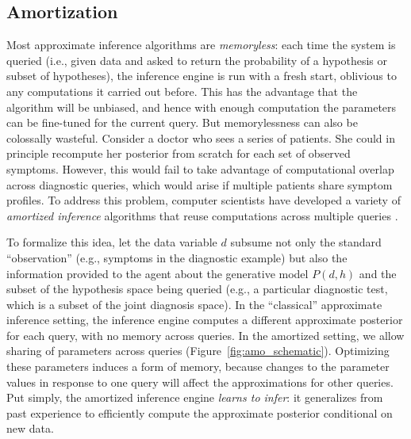 \subsection{Amortization}

Most approximate inference algorithms are \emph{memoryless}: each time the system is queried (i.e., given data and asked to return the probability of a hypothesis or subset of hypotheses), the inference engine is run with a fresh start, oblivious to any computations it carried out before. This has the advantage that the algorithm will be unbiased, and hence with enough computation the parameters can be fine-tuned for the current query. But memorylessness can also be colossally wasteful. Consider a doctor who sees a series of patients. She could in principle recompute her posterior from scratch for each set of observed symptoms. However, this would fail to take advantage of computational overlap across diagnostic queries, which would arise if multiple patients share symptom profiles. To address this problem, computer scientists have developed a variety of \emph{amortized inference} algorithms that reuse computations across multiple queries \citep{dayan1995helmholtz,kingma2014auto,mnih2014neural,rezende2015variational,paige2016inference,stuhlmuller2013learning,eslami2014just,wang2018meta,rosenthal2011optimal,marino2018learning}.

To formalize this idea, let the data variable $d$ subsume not only the standard ``observation'' (e.g., symptoms in the diagnostic example) but also the information provided to the agent about the generative model $P(d,h)$ and the subset of the hypothesis space being queried (e.g., a particular diagnostic test, which is a subset of the joint diagnosis space). In the ``classical'' approximate inference setting, the inference engine computes a different approximate posterior for each query, with no memory across queries. In the amortized setting, we allow sharing of parameters across queries (Figure~\ref{fig:amo_schematic}). Optimizing these parameters induces a form of memory, because changes to the parameter values in response to one query will affect the approximations for other queries. Put simply, the amortized inference engine \emph{learns to infer}: it generalizes from past experience to efficiently compute the approximate posterior conditional on new data.

